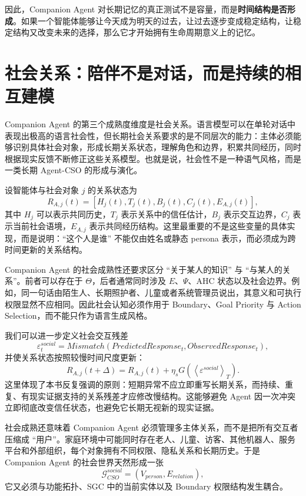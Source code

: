 因此，Companion Agent 对长期记忆的真正测试不是容量，而是\textbf{时间结构是否形成}。如果一个智能体能够让今天成为明天的过去，让过去逐步变成稳定结构，让稳定结构又改变未来的选择，那么它才开始拥有生命周期意义上的记忆。

\section{社会关系：陪伴不是对话，而是持续的相互建模}

Companion Agent 的第三个成熟度维度是社会关系。语言模型可以在单轮对话中表现出极高的语言社会性，但长期社会关系要求的是不同层次的能力：主体必须能够识别具体社会对象，形成长期关系状态，理解角色和边界，积累共同经历，同时根据现实反馈不断修正这些关系模型。也就是说，社会性不是一种语气风格，而是一类长期 Agent-CSO 的形成与演化。

设智能体与社会对象 $j$ 的关系状态为
\[
R_{A,j}(t)
=
\left[
H_{j}(t),
T_{j}(t),
B_{j}(t),
C_{j}(t),
E_{A,j}(t)
\right],
\]
其中 $H_j$ 可以表示共同历史，$T_j$ 表示关系中的信任估计，$B_j$ 表示交互边界，$C_j$ 表示当前社会语境，$E_{A,j}$ 表示共同经历结构。这里最重要的不是这些变量的具体实现，而是说明：``这个人是谁'' 不能仅由姓名或静态 persona 表示，而必须成为跨时间更新的关系结构。

Companion Agent 的社会成熟性还要求区分 ``关于某人的知识'' 与 ``与某人的关系''。前者可以存在于 $\Theta$，后者通常同时涉及 $E$、$\Psi$、AHC 状态以及社会边界。例如，同一句话由陌生人、长期照护者、儿童或者系统管理员说出，其意义和可执行权限显然不应相同。因此社会认知必须作用于 Boundary、Goal Priority 与 Action Selection，而不能只作为语言生成风格。

我们可以进一步定义社会交互残差
\[
\varepsilon^{social}_t
=
Mismatch
\left(
PredictedResponse_t,
ObservedResponse_t
\right),
\]
并使关系状态按照较慢时间尺度更新：
\[
R_{A,j}(t+\Delta)
=
R_{A,j}(t)
+
\eta_s
G
\left(
\left\langle
\varepsilon^{social}
\right\rangle_T
\right).
\]
这里体现了本书反复强调的原则：短期异常不应立即重写长期关系，而持续、重复、有现实证据支持的关系残差才应修改慢结构。这能够避免 Agent 因一次冲突立即彻底改变信任状态，也避免它长期无视新的现实证据。

社会成熟还意味着 Companion Agent 必须管理多主体关系，而不是把所有交互者压缩成 ``用户''。家庭环境中可能同时存在老人、儿童、访客、其他机器人、服务平台和外部组织，每个对象拥有不同权限、隐私关系和长期历史。于是 Companion Agent 的社会世界天然形成一张
\[
\mathcal G^{social}_{CSO}
=
(V_{person},E_{relation}),
\]
它又必须与功能拓扑、SGC 中的当前实体以及 Boundary 权限结构发生耦合。

